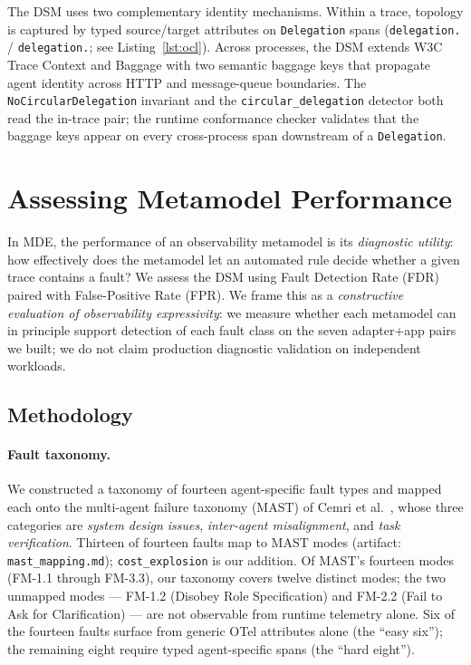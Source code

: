 \documentclass[sigconf,nonacm]{acmart}
\begin{document}
The DSM uses two complementary identity mechanisms. Within a trace, topology is captured by typed source/target attributes on \texttt{Delegation} spans (\texttt{delegation.} / \texttt{delegation.}; see Listing~\ref{lst:ocl}). Across processes, the DSM extends W3C Trace Context \cite{w3c-trace-context} and Baggage \cite{w3c-baggage} with two semantic baggage keys that propagate agent identity across HTTP and message-queue boundaries. The \texttt{NoCircularDelegation} invariant and the \texttt{circular\_delegation} detector both read the in-trace pair; the runtime conformance checker validates that the baggage keys appear on every cross-process span downstream of a \texttt{Delegation}.

\section{Assessing Metamodel Performance}
\label{sec:assessment}

In MDE, the performance of an observability metamodel is its \emph{diagnostic utility}: how effectively does the metamodel let an automated rule decide whether a given trace contains a fault? We assess the DSM using Fault Detection Rate (FDR) paired with False-Positive Rate (FPR). We frame this as a \emph{constructive evaluation of observability expressivity}: we measure whether each metamodel can in principle support detection of each fault class on the seven adapter+app pairs we built; we do not claim production diagnostic validation on independent workloads.

\subsection{Methodology}

\paragraph{Fault taxonomy.}
We constructed a taxonomy of fourteen agent-specific fault types and mapped each onto the multi-agent failure taxonomy (MAST) of Cemri et al.\ \cite{cemri2025multiagent}, whose three categories are \emph{system design issues}, \emph{inter-agent misalignment}, and \emph{task verification}. Thirteen of fourteen faults map to MAST modes (artifact: \texttt{mast\_}\-\texttt{mapping.md}); \texttt{cost\_explosion} is our addition. Of MAST's fourteen modes (FM-1.1 through FM-3.3), our taxonomy covers twelve distinct modes; the two unmapped modes --- FM-1.2 (Disobey Role Specification) and FM-2.2 (Fail to Ask for Clarification) --- are not observable from runtime telemetry alone. Six of the fourteen faults surface from generic OTel attributes alone (the ``easy six''); the remaining eight require typed agent-specific spans (the ``hard eight'').
\end{document}
